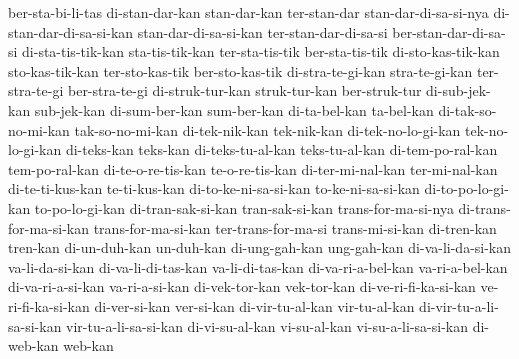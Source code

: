 {ber-sta-bi-li-tas di-stan-dar-kan stan-dar-kan ter-stan-dar stan-dar-di-sa-si-nya di-stan-dar-di-sa-si-kan stan-dar-di-sa-si-kan ter-stan-dar-di-sa-si
ber-stan-dar-di-sa-si di-sta-tis-tik-kan sta-tis-tik-kan ter-sta-tis-tik ber-sta-tis-tik di-sto-kas-tik-kan sto-kas-tik-kan ter-sto-kas-tik
ber-sto-kas-tik di-stra-te-gi-kan stra-te-gi-kan ter-stra-te-gi ber-stra-te-gi di-struk-tur-kan struk-tur-kan ber-struk-tur
di-sub-jek-kan sub-jek-kan di-sum-ber-kan sum-ber-kan di-ta-bel-kan ta-bel-kan di-tak-so-no-mi-kan tak-so-no-mi-kan
di-tek-nik-kan tek-nik-kan di-tek-no-lo-gi-kan tek-no-lo-gi-kan di-teks-kan teks-kan di-teks-tu-al-kan teks-tu-al-kan
di-tem-po-ral-kan tem-po-ral-kan di-te-o-re-tis-kan te-o-re-tis-kan di-ter-mi-nal-kan ter-mi-nal-kan di-te-ti-kus-kan te-ti-kus-kan
di-to-ke-ni-sa-si-kan to-ke-ni-sa-si-kan di-to-po-lo-gi-kan to-po-lo-gi-kan di-tran-sak-si-kan tran-sak-si-kan trans-for-ma-si-nya di-trans-for-ma-si-kan
trans-for-ma-si-kan ter-trans-for-ma-si trans-mi-si-kan di-tren-kan tren-kan di-un-duh-kan un-duh-kan di-ung-gah-kan
ung-gah-kan di-va-li-da-si-kan va-li-da-si-kan di-va-li-di-tas-kan va-li-di-tas-kan di-va-ri-a-bel-kan va-ri-a-bel-kan di-va-ri-a-si-kan
va-ri-a-si-kan di-vek-tor-kan vek-tor-kan di-ve-ri-fi-ka-si-kan ve-ri-fi-ka-si-kan di-ver-si-kan ver-si-kan di-vir-tu-al-kan
vir-tu-al-kan di-vir-tu-a-li-sa-si-kan vir-tu-a-li-sa-si-kan di-vi-su-al-kan vi-su-al-kan vi-su-a-li-sa-si-kan di-web-kan web-kan
}
\endinput
